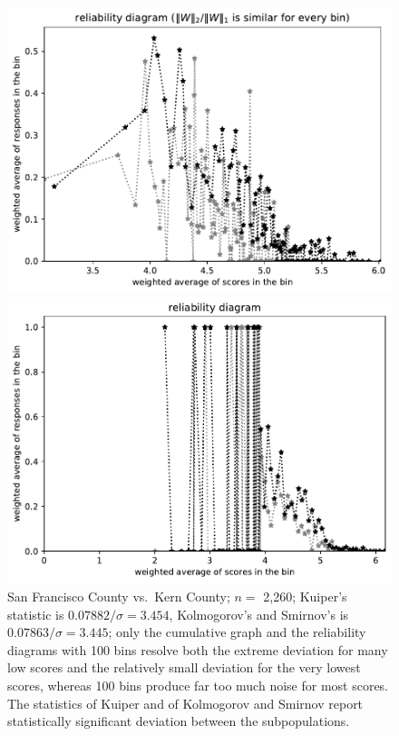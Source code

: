 \documentclass{article}
\newlength{\imsize}
\begin{document}
\begin{figure}
\begin{centering}
\parbox{\imsize}{\includegraphics[width=\imsize]
{../codes/weighted/County_of_San_Francisco_vs_Kern-LNGI/equierrs100.pdf}}
\quad\quad
\parbox{\imsize}{\includegraphics[width=\imsize]
{../codes/weighted/County_of_San_Francisco_vs_Kern-LNGI/equiscores100.pdf}}

\end{centering}
\caption{San Francisco County vs.\ Kern County; $n =$ 2,260;
         Kuiper's statistic is $0.07882 / \sigma = 3.454$,
         Kolmogorov's and Smirnov's is $0.07863 / \sigma = 3.445$;
         only the cumulative graph and the reliability diagrams with 100 bins
         resolve both the extreme deviation for many low scores
         and the relatively small deviation for the very lowest scores,
         whereas 100 bins produce far too much noise for most scores.
         The statistics of Kuiper and of Kolmogorov and Smirnov report
         statistically significant deviation between the subpopulations.
}
\label{San_Francisco-Kern}
\end{figure}
\end{document}
